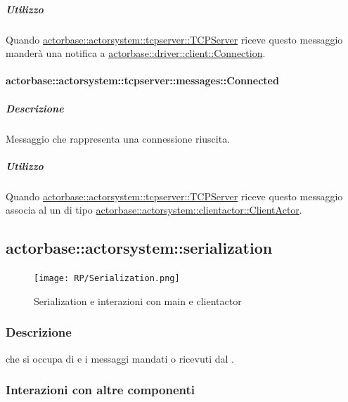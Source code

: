 \documentclass{scalatekids-article}
\begin{document}
\subparagraph{Utilizzo}

Quando \hyperref[sec:actorbase::actorsystem::tcpserver::TCPServer]{actorbase::actorsystem::tcpserver::TCPServer}
riceve questo messaggio manderà una notifica a
\hyperref[sec:actorbase::driver::client::Connection]{actorbase::driver::client::Connection}.

\paragraph{actorbase::actorsystem::tcpserver::messages::Connected}
\label{sec:actorbase::actorsystem::tcpserver::messages::Connected}

\subparagraph{Descrizione}

Messaggio che rappresenta una connessione  riuscita.

\subparagraph{Utilizzo}

Quando \hyperref[sec:actorbase::actorsystem::tcpserver::TCPServer]{actorbase::actorsystem::tcpserver::TCPServer}
riceve questo messaggio associa al  un  di tipo
\hyperref[sec:actorbase::actorsystem::clientactor::ClientActor]{actorbase::actorsystem::clientactor::ClientActor}.

\subsection{actorbase::actorsystem::serialization}
\label{sec:actorbase::actorsystem::serialization}

\begin{figure}[H]
  \begin{center}
    \texttt{[image: RP/Serialization.png]}
    \caption{Serialization e interazioni con main e clientactor}
  \end{center}
\end{figure}

\subsubsection{Descrizione}

 che si occupa di  e 
i messaggi mandati o ricevuti dal .

\subsubsection{Interazioni con altre componenti}
\end{document}
